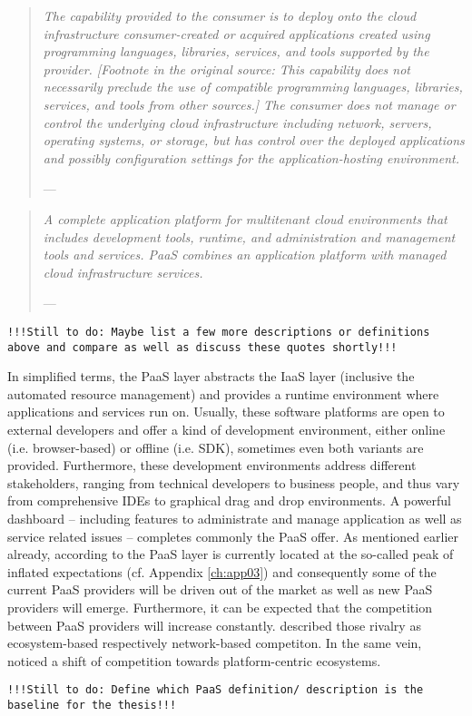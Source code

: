 \begin{quotation}{\slshape 
The capability provided to the consumer is to deploy onto the cloud infrastructure consumer-created or acquired applications created using programming languages, libraries, services, and tools supported by the provider. [Footnote in the original source: This capability does not necessarily preclude the use of compatible programming languages, libraries, services, and tools from other sources.] The consumer does not manage or control the underlying cloud infrastructure including network, servers, operating systems, or storage, but has control over the deployed applications and possibly configuration settings for the application-hosting environment.}
\vspace*{-7pt}
\begin{flushright}
	--- \citealp[pp. 2-3]{Mell2011}
\end{flushright}
\end{quotation}

\begin{quotation}{\slshape
A complete application platform for multitenant cloud environments that includes development tools, runtime, and administration and management tools and services. PaaS combines an application platform with managed cloud infrastructure services.}
\vspace*{-7pt}
\begin{flushright}
	--- \citealp[p. 2]{Hendrick2012a}
\end{flushright}
\end{quotation}

\texttt{!!!Still to do: Maybe list a few more descriptions or definitions above and compare as well as discuss these quotes shortly!!!}

In simplified terms, the \ac{PaaS} layer abstracts the \ac{IaaS} layer (inclusive the automated resource management) and provides a runtime environment where applications and services run on. Usually, these software platforms are open to external developers and offer a kind of development environment, either online (i.e. browser-based) or offline (i.e. \ac{SDK}), sometimes even both variants are provided. Furthermore, these development environments address different stakeholders, ranging from technical developers to business people, and thus vary from comprehensive \acp{IDE} to graphical drag and drop environments. A powerful dashboard -- including features to administrate and manage application as well as service related issues -- completes commonly the \ac{PaaS} offer.
As mentioned earlier already, according to \citet[p. 5]{Smith2012} the \ac{PaaS} layer is currently located at the so-called peak of inflated expectations (cf. Appendix \ref{ch:app03}) and consequently some of the current \ac{PaaS} providers will be driven out of the market as well as new \ac{PaaS} providers will emerge. Furthermore, it can be expected that the competition between \ac{PaaS} providers will increase constantly. \citet[pp. 117,128-129]{Iyer2010} described those rivalry as ecosystem-based respectively network-based competiton. In the same vein, \citet[pp. 675-676]{Tiwana2010} noticed a shift of competition towards platform-centric ecosystems.

\texttt{!!!Still to do: Define which PaaS definition/ description is the baseline for the thesis!!!}